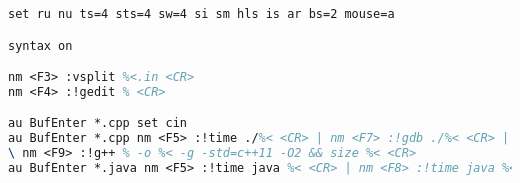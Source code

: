 \begin{lstlisting}[language=tex,identifierstyle=\color{black},commentstyle=\color{black}]
set ru nu ts=4 sts=4 sw=4 si sm hls is ar bs=2 mouse=a

syntax on

nm <F3> :vsplit %<.in <CR>
nm <F4> :!gedit % <CR>

au BufEnter *.cpp set cin
au BufEnter *.cpp nm <F5> :!time ./%< <CR> | nm <F7> :!gdb ./%< <CR> | nm <F8> :!time ./%< < %<.in <CR> | 
\ nm <F9> :!g++ % -o %< -g -std=c++11 -O2 && size %< <CR>
au BufEnter *.java nm <F5> :!time java %< <CR> | nm <F8> :!time java %< < %<.in | nm <F9> :!javac % <CR>
\end{lstlisting}

